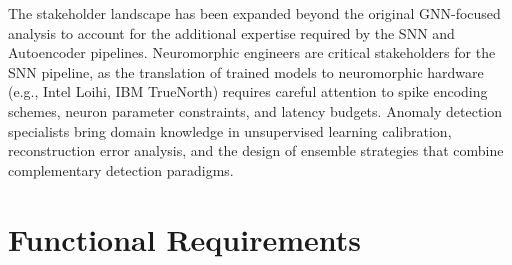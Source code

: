 The stakeholder landscape has been expanded beyond the original GNN-focused analysis to account for the additional expertise required by the SNN and Autoencoder pipelines. Neuromorphic engineers are critical stakeholders for the SNN pipeline, as the translation of trained models to neuromorphic hardware (e.g., Intel Loihi, IBM TrueNorth) requires careful attention to spike encoding schemes, neuron parameter constraints, and latency budgets. Anomaly detection specialists bring domain knowledge in unsupervised learning calibration, reconstruction error analysis, and the design of ensemble strategies that combine complementary detection paradigms.

\section{Functional Requirements}


